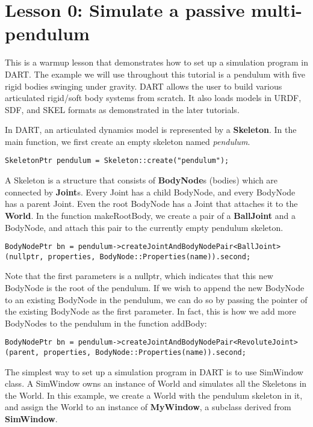 \section{Lesson 0: Simulate a passive multi-pendulum}

This is a warmup lesson that demonstrates how to set up a simulation program in DART. The example we will use throughout this tutorial is a pendulum with five rigid bodies swinging under gravity. DART allows the user to build various articulated rigid/soft body systems from scratch. It also loads models in URDF, SDF, and SKEL formats as demonstrated in the later tutorials.

In DART, an articulated dynamics model is represented by a \textbf{Skeleton}. In the main function, we first create an empty skeleton named \emph{pendulum}.

\begin{lstlisting}
SkeletonPtr pendulum = Skeleton::create("pendulum");
\end{lstlisting}

A Skeleton is a structure that consists of \textbf{BodyNode}s (bodies) which are connected by \textbf{ Joint}s. Every Joint has a child BodyNode, and every BodyNode has a parent Joint. Even the root BodyNode has a Joint that attaches it to the \textbf{World}. In the function makeRootBody, we create a pair of a \textbf{BallJoint} and a BodyNode, and attach this pair to the currently empty pendulum skeleton.

\begin{lstlisting}
BodyNodePtr bn = pendulum->createJointAndBodyNodePair<BallJoint>(nullptr, properties, BodyNode::Properties(name)).second;
\end{lstlisting}

Note that the first parameters is a nullptr, which indicates that this new BodyNode is the root of the pendulum. If we wish to append the new BodyNode to an existing BodyNode in the pendulum, we can do so by passing the pointer of the existing BodyNode as the first parameter. In fact, this is how we add more BodyNodes to the pendulum in the function addBody:

\begin{lstlisting}
BodyNodePtr bn = pendulum->createJointAndBodyNodePair<RevoluteJoint>(parent, properties, BodyNode::Properties(name)).second;
\end{lstlisting}

The simplest way to set up a simulation program in DART is to use SimWindow class. A SimWindow owns an instance of World and simulates all the Skeletons in the World. In this example, we create a World with the pendulum skeleton in it, and assign the World to an instance of \textbf{MyWindow}, a subclass derived from \textbf{SimWindow}.

